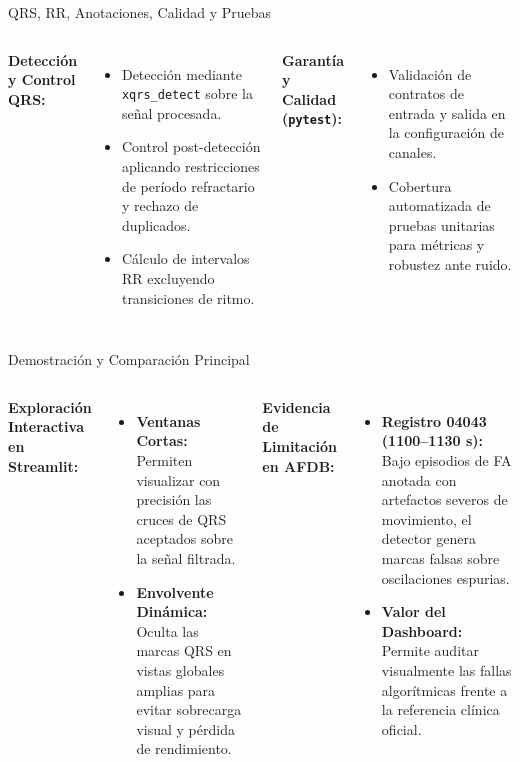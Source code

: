 \documentclass[aspectratio=169]{beamer}
\begin{document}
\begin{frame}{QRS, RR, Anotaciones, Calidad y Pruebas}
    \begin{columns}[T]
        \textbf{Detección y Control QRS:}
        \begin{itemize}
            \small
            \item Detección mediante \texttt{xqrs\_detect} sobre la señal procesada.
            \item Control post-detección aplicando restricciones de período refractario y rechazo de duplicados.
            \item Cálculo de intervalos RR excluyendo transiciones de ritmo.
        \end{itemize}
        
        \textbf{Garantía y Calidad (\texttt{pytest}):}
        \begin{itemize}
            \small
            \item Validación de contratos de entrada y salida en la configuración de canales.
            \item Cobertura automatizada de pruebas unitarias para métricas y robustez ante ruido.
        \end{itemize}
    \end{columns}
\end{frame}

\begin{frame}{Demostración y Comparación Principal}
    \begin{columns}[T]
        \textbf{Exploración Interactiva en Streamlit:}
        \begin{itemize}
            \small
            \item \textbf{Ventanas Cortas:} Permiten visualizar con precisión las cruces de QRS aceptados sobre la señal filtrada.
            \item \textbf{Envolvente Dinámica:} Oculta las marcas QRS en vistas globales amplias para evitar sobrecarga visual y pérdida de rendimiento.
        \end{itemize}
        
        \textbf{Evidencia de Limitación en AFDB:}
        \begin{itemize}
            \small
            \item \textbf{Registro 04043 (1100–1130 s):} Bajo episodios de FA anotada con artefactos severos de movimiento, el detector genera marcas falsas sobre oscilaciones espurias.
            \item \textbf{Valor del Dashboard:} Permite auditar visualmente las fallas algorítmicas frente a la referencia clínica oficial.
        \end{itemize}
    \end{columns}
\end{frame}
\end{document}
